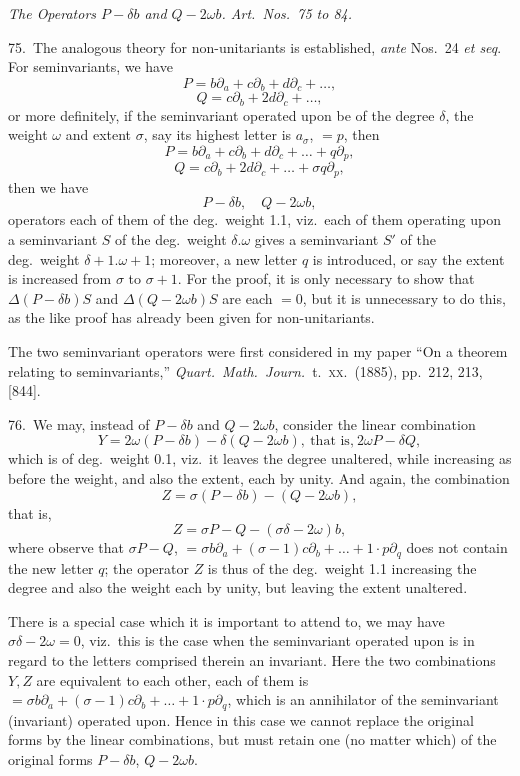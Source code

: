 \documentclass[11pt]{article}
\begin{document}
\clearpage
\begin{center}
\textit{The Operators $P - \delta b$ and $Q - 2\omega b$. Art.\ Nos.\ 75 to 84.}
\end{center}

75.\ The analogous theory for non-unitariants is established, \textit{ante} Nos.\ 24 \textit{et seq}. For seminvariants, we have
\[
P = b\partial_a + c\partial_b + d\partial_c + \ldots,
\]
\[
Q = c\partial_b + 2d\partial_c + \ldots,
\]
or more definitely, if the seminvariant operated upon be of the degree $\delta$, the weight $\omega$ and extent $\sigma$, say its highest letter is $a_\sigma$, $= p$, then
\[
P = b\partial_a + c\partial_b + d\partial_c + \ldots + q\partial_p,
\]
\[
Q = c\partial_b + 2d\partial_c + \ldots + \sigma q\partial_p,
\]
then we have
\[
P - \delta b,\quad Q - 2\omega b,
\]
operators each of them of the deg.\ weight 1.1, viz.\ each of them operating upon a seminvariant $S$ of the deg.\ weight $\delta . \omega$ gives a seminvariant $S'$ of the deg.\ weight $\delta + 1 . \omega + 1$; moreover, a new letter $q$ is introduced, or say the extent is increased from $\sigma$ to $\sigma + 1$. For the proof, it is only necessary to show that $\Delta (P - \delta b)S$ and $\Delta (Q - 2\omega b)S$ are each $= 0$, but it is unnecessary to do this, as the like proof has already been given for non-unitariants.

The two seminvariant operators were first considered in my paper ``On a theorem relating to seminvariants,'' \textit{Quart.\ Math.\ Journ.}\ t.\ \textsc{xx}.\ (1885), pp.\ 212, 213, [844].

76.\ We may, instead of $P - \delta b$ and $Q - 2\omega b$, consider the linear combination
\[
Y = 2\omega (P - \delta b) - \delta (Q - 2\omega b),\ \text{that is,}\ 2\omega P - \delta Q,
\]
which is of deg.\ weight 0.1, viz.\ it leaves the degree unaltered, while increasing as before the weight, and also the extent, each by unity. And again, the combination
\[
Z = \sigma (P - \delta b) - (Q - 2\omega b),
\]
that is,
\[
Z = \sigma P - Q - (\sigma \delta - 2\omega) b,
\]
where observe that $\sigma P - Q$, $= \sigma b\partial_a + (\sigma - 1) c\partial_b + \ldots + 1 \cdot p\partial_q$ does not contain the new letter $q$; the operator $Z$ is thus of the deg.\ weight 1.1 increasing the degree and also the weight each by unity, but leaving the extent unaltered.

There is a special case which it is important to attend to, we may have $\sigma \delta - 2\omega = 0$, viz.\ this is the case when the seminvariant operated upon is in regard to the letters comprised therein an invariant. Here the two combinations $Y, Z$ are equivalent to each other, each of them is $= \sigma b\partial_a + (\sigma - 1) c\partial_b + \ldots + 1 \cdot p\partial_q$, which is an annihilator of the seminvariant (invariant) operated upon. Hence in this case we cannot replace the original forms by the linear combinations, but must retain one (no matter which) of the original forms $P - \delta b$, $Q - 2\omega b$.
\end{document}
